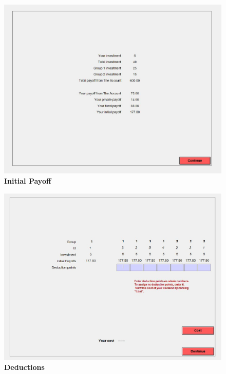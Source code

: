 \documentclass[12pt]{article}
\begin{document}
\centering
\begin{figure}[H]
\includegraphics[width=40pc]{initialpayoff_edit}
\caption*{\bf Initial Payoff}
\end{figure}

\newpage

\centering
\begin{figure}[H]
\includegraphics[width=40pc]{deductionsFM}
\caption*{\bf Deductions}
\end{figure}

\newpage
\end{document}
